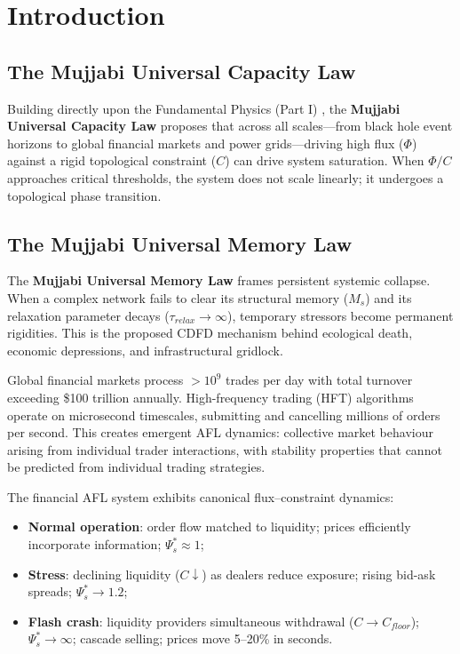 \documentclass[11pt]{article}
\begin{document}
\section{Introduction}


\subsection{The Mujjabi Universal Capacity Law}
Building directly upon the Fundamental Physics (Part I) \cite{MujjabiPartI2026}, the \textbf{Mujjabi Universal Capacity Law} proposes that across all scales---from black hole event horizons to global financial markets and power grids---driving high flux ($\Phi$) against a rigid topological constraint ($C$) can drive system saturation. When $\Phi/C$ approaches critical thresholds, the system does not scale linearly; it undergoes a topological phase transition.

\subsection{The Mujjabi Universal Memory Law}
The \textbf{Mujjabi Universal Memory Law} frames persistent systemic collapse. When a complex network fails to clear its structural memory ($M_s$) and its relaxation parameter decays ($\tau_{relax} \to \infty$), temporary stressors become permanent rigidities. This is the proposed CDFD mechanism behind ecological death, economic depressions, and infrastructural gridlock.


Global financial markets process $>10^9$ trades per day with total turnover exceeding \$100
trillion annually. High-frequency trading (HFT) algorithms operate on microsecond timescales,
submitting and cancelling millions of orders per second. This creates emergent AFL dynamics:
collective market behaviour arising from individual trader interactions, with stability properties
that cannot be predicted from individual trading strategies.

The financial AFL system exhibits canonical flux--constraint dynamics:
\begin{itemize}
    \item \textbf{Normal operation}: order flow matched to liquidity; prices efficiently incorporate
          information; $\Psi_s^* \approx 1$;
    \item \textbf{Stress}: declining liquidity ($C \downarrow$) as dealers reduce exposure; rising
          bid-ask spreads; $\Psi_s^* \to 1.2$;
    \item \textbf{Flash crash}: liquidity providers simultaneous withdrawal ($C \to C_{floor}$);
          $\Psi_s^* \to \infty$; cascade selling; prices move 5--20\% in seconds.
\end{itemize}
\end{document}
